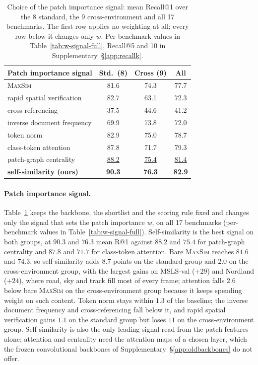 \begin{table}[!htb]
\centering
\caption{Choice of the patch importance signal: mean Recall@1 over the 8 standard, the 9 cross-environment and all 17 benchmarks. The first row applies no weighting at all; every row below it changes only $w$. Per-benchmark values in Table~\ref{tab:w-signal-full}, Recall@5 and 10 in Supplementary~\S\ref{app:recallk}.}
\label{tab:w-signal}
{\scriptsize\setlength{\tabcolsep}{5pt}
\begin{tabular}{lccc}
\toprule
Patch importance signal & Std.\ (8) & Cross (9) & All \\
\midrule
\textsc{MaxSim} \citep{chamfer} & 81.6 & 74.3 & 77.7 \\
\midrule
rapid spatial verification \citep{patchnetvlad} & 82.7 & 63.1 & 72.3 \\
cross-referencing \citep{deepemd} & 37.5 & 44.6 & 41.2 \\
inverse document frequency \citep{videogoogle} & 69.9 & 73.8 & 72.0 \\
token norm \citep{registers} & 82.9 & 75.0 & 78.7 \\
class-token attention \citep{effovpr} & 87.8 & 71.7 & 79.3 \\
patch-graph centrality \citep{sap} & \underline{88.2} & \underline{75.4} & \underline{81.4} \\
\textbf{self-similarity (ours)} & \textbf{90.3} & \textbf{76.3} & \textbf{82.9} \\
\bottomrule
\end{tabular}}
\end{table}

\paragraph{Patch importance signal.} Table~\ref{tab:w-signal} keeps the backbone, the shortlist and the scoring rule fixed and changes only the signal that sets the patch importance $w$, on all 17 benchmarks (per-benchmark values in Table~\ref{tab:w-signal-full}). Self-similarity is the best signal on both groups, at $90.3$ and $76.3$ mean R@1 against $88.2$ and $75.4$ for patch-graph centrality and $87.8$ and $71.7$ for class-token attention. Bare \textsc{MaxSim} reaches $81.6$ and $74.3$, so self-similarity adds $8.7$ points on the standard group and $2.0$ on the cross-environment group, with the largest gains on MSLS-val ($+29$) and Nordland ($+24$), where road, sky and track fill most of every frame; attention falls $2.6$ below bare \textsc{MaxSim} on the cross-environment group because it keeps spending weight on such content. Token norm stays within $1.3$ of the baseline; the inverse document frequency and cross-referencing fall below it, and rapid spatial verification gains $1.1$ on the standard group but loses $11$ on the cross-environment group. Self-similarity is also the only leading signal read from the patch features alone; attention and centrality need the attention maps of a chosen layer, which the frozen convolutional backbones of Supplementary~\S\ref{app:oldbackbones} do not offer.


